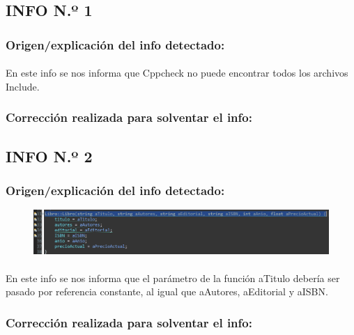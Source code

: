 	\subsection{INFO N.º 1}
	
		\subsubsection{Origen/explicación del info detectado:}
		
			\paragraph{}En este info se nos informa que Cppcheck no puede encontrar todos los archivos Include.
			
		\subsubsection{Corrección realizada para solventar el info:}
		
	\subsection{INFO N.º 2}
	
		\subsubsection{Origen/explicación del info detectado:}
		
			\begin{figure}[H]
				\centering
				\includegraphics[scale=0.55]{img/esteban10.png}
				\label{esteban10}
			\end{figure}
		
			\paragraph{}En este info se nos informa que el parámetro de la función aTitulo debería ser pasado por referencia constante, al igual que aAutores, aEditorial y aISBN.
			
		\subsubsection{ Corrección realizada para solventar el info:}
		
